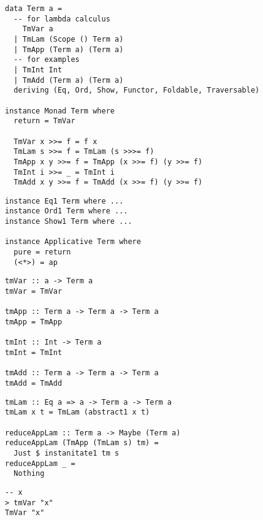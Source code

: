 
\begin{frame}[fragile]
\begin{verbatim}
data Term a = 
  -- for lambda calculus
    TmVar a 
  | TmLam (Scope () Term a) 
  | TmApp (Term a) (Term a)
  -- for examples
  | TmInt Int
  | TmAdd (Term a) (Term a)
  deriving (Eq, Ord, Show, Functor, Foldable, Traversable)

instance Monad Term where
  return = TmVar

  TmVar x >>= f = f x
  TmLam s >>= f = TmLam (s >>>= f)
  TmApp x y >>= f = TmApp (x >>= f) (y >>= f)
  TmInt i >>= _ = TmInt i
  TmAdd x y >>= f = TmAdd (x >>= f) (y >>= f)
\end{verbatim}
\end{frame}

\begin{frame}[fragile]
\begin{verbatim}
instance Eq1 Term where ...
instance Ord1 Term where ...
instance Show1 Term where ...

instance Applicative Term where
  pure = return
  (<*>) = ap
\end{verbatim}
\end{frame}

\begin{frame}[fragile]
\begin{verbatim}
tmVar :: a -> Term a
tmVar = TmVar

tmApp :: Term a -> Term a -> Term a
tmApp = TmApp

tmInt :: Int -> Term a
tmInt = TmInt

tmAdd :: Term a -> Term a -> Term a
tmAdd = TmAdd
\end{verbatim}
\end{frame}

\begin{frame}[fragile]
\begin{verbatim}
tmLam :: Eq a => a -> Term a -> Term a
tmLam x t = TmLam (abstract1 x t)

reduceAppLam :: Term a -> Maybe (Term a)
reduceAppLam (TmApp (TmLam s) tm) = 
  Just $ instanitate1 tm s
reduceAppLam _ = 
  Nothing
\end{verbatim}
\end{frame}

\begin{frame}[fragile]
\begin{verbatim}
-- x
> tmVar "x"
TmVar "x"
\end{verbatim}
\end{frame}

